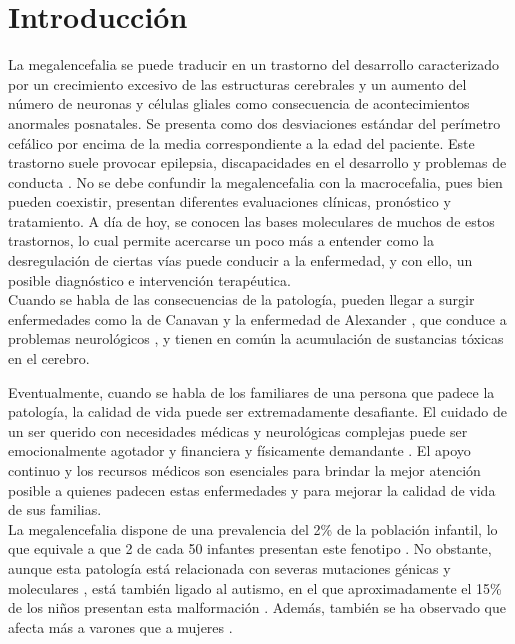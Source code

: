 \section{Introducción}

La megalencefalia se puede traducir en un trastorno del desarrollo caracterizado por un crecimiento excesivo de las estructuras cerebrales y un aumento del número de neuronas y células gliales como consecuencia de acontecimientos anormales posnatales. Se presenta como dos desviaciones estándar del perímetro cefálico por encima de la media correspondiente a la edad del paciente. Este trastorno suele provocar epilepsia, discapacidades en el desarrollo y problemas de conducta \cite{pavone_clinical_2017}.
No se debe confundir la megalencefalia con la macrocefalia, pues bien pueden coexistir, presentan diferentes evaluaciones clínicas, pronóstico y tratamiento. 
A día de hoy, se conocen las bases moleculares de muchos de estos trastornos, lo cual permite acercarse un poco más a entender como la desregulación de ciertas vías puede conducir a la enfermedad, y con ello, un posible diagnóstico e intervención terapéutica. \cite{winden_megalencephaly_2015} \\

Cuando se habla de las consecuencias de la patología, pueden llegar a surgir enfermedades como la de Canavan \cite{avellaneda_errores_2014} y la enfermedad de Alexander \cite{hagemann_alexander_2022}, que conduce a problemas neurológicos \cite{winden_megalencephaly_2015}, y tienen en común la acumulación de sustancias tóxicas en el cerebro.

Eventualmente, cuando se habla de los familiares de una persona que padece la patología, la calidad de vida puede ser extremadamente desafiante. El cuidado de un ser querido con necesidades médicas y neurológicas complejas puede ser emocionalmente agotador y financiera y físicamente demandante \cite{olivares_jimenez_ninos_2021}. El apoyo continuo y los recursos médicos son esenciales para brindar la mejor atención posible a quienes padecen estas enfermedades y para mejorar la calidad de vida de sus familias. \\


La megalencefalia dispone de una prevalencia del 2\% de la población infantil, lo que equivale a que 2 de cada 50 infantes presentan este fenotipo \cite{sandler_neurodevelopmental_1997}. No obstante, aunque esta patología está relacionada con severas mutaciones génicas y moleculares \cite{pavone_clinical_2017}, está también ligado al autismo, en el que aproximadamente el 15\% de los niños presentan esta malformación \cite{libero_persistence_2016}. Además, también se ha observado que afecta más a varones que a mujeres \cite{noauthor_megalencephaly_nodate}. \\

